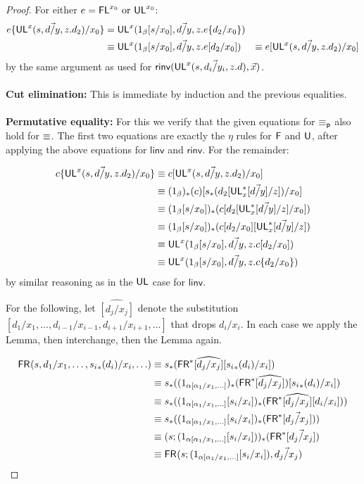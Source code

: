 \begin{proof}
For either $e = \mathsf{FL}^{x_0} \text{ or } \mathsf{UL}^{x_0}$:
\begin{align*}
e\{\mathsf{UL}^{x}_{}(s,\vec{d/y},z.d_2)/x_0\} 
&= \mathsf{UL}^{x}_{}(1_\beta[s/x_0],\vec{d/y},z.e\{d_2/x_0\}) \\
&\equiv \mathsf{UL}^{x}_{}(1_\beta[s/x_0],\vec{d/y},z.e[d_2/x_0]) 
&\equiv e[\mathsf{UL}^{x}_{}(s,\vec{d/y},z.d_2)/x_0] 
\end{align*}
by the same argument as used for $\mathsf{rinv}(\mathsf{UL}^{x}_{}(s,\vec{d_i/y_i},z.d),\vec{x})$.
\\~\\
\textbf{Cut elimination:} This is immediate by induction and the previous equalities.
\\~\\
\textbf{Permutative equality:} 
For this we verify that the given equations for $\equiv_{\mathsf{p}}$ also hold for $\equiv$. The first two equations are exactly the $\eta$ rules for $\mathsf{F}$ and $\mathsf{U}$, after applying the above equations for $\mathsf{linv}$ and $\mathsf{rinv}$. For the remainder:

\begin{align*}
c\{\mathsf{UL}^{x}_{}(s,\vec{d/y},z.d_2)/x_0\} 
&\equiv c[\mathsf{UL}^{x}_{}(s,\vec{d/y},z.d_2)/x_0] \\
&\equiv (1_\beta)_*(c)[s_*(d_2[\mathsf{UL}^*_{x}[\vec{d/y}]/z])/x_0] \\
&\equiv (1_\beta[s/x_0])_*(c[d_2[\mathsf{UL}^*_{x}[\vec{d/y}]/z]/x_0]) \\
&\equiv (1_\beta[s/x_0])_*(c[d_2/x_0][\mathsf{UL}^*_{x}[\vec{d/y}]/z]) \\
&\equiv \mathsf{UL}^{x}_{}(1_\beta[s/x_0],\vec{d/y},z.c[d_2/x_0]) \\
&\equiv \mathsf{UL}^{x}_{}(1_\beta[s/x_0],\vec{d/y},z.c\{d_2/x_0\}) \\
\end{align*}
by similar reasoning as in the $\mathsf{UL}$ case for $\mathsf{linv}$.

For the following, let $\widehat{[d_j/x_j]}$ denote the substitution $[d_1/x_1, \dots, d_{i-1}/x_{i-1}, d_{i+1}/x_{i+1}, \dots]$ that drops $d_i/x_i$. In each case we apply the Lemma, then interchange, then the Lemma again.

\begin{align*}
\mathsf{FR}_{}(s,d_1/x_1,\ldots,{s_i}_*(d_i)/x_i,\ldots) 
&\equiv s_*(\mathsf{FR}^*\widehat{[d_j/x_j]}[{s_i}_*(d_i)/x_i])\\
&\equiv s_*((1_{\alpha[\alpha_1/x_1,\ldots]})_*(\mathsf{FR}^*\widehat{[d_j/x_j]})[{s_i}_*(d_i)/x_i])\\
&\equiv s_*((1_{\alpha[\alpha_1/x_1,\ldots]}[s_i/x_i])_*(\mathsf{FR}^*\widehat{[d_j/x_j]}[d_i/x_i]))\\
&\equiv s_*((1_{\alpha[\alpha_1/x_1,\ldots]}[s_i/x_i])_*(\mathsf{FR}^*[\vec{d_j/x_j}]))\\
&\equiv (s;(1_{\alpha[\alpha_1/x_1,\ldots]}[s_i/x_i]))_*(\mathsf{FR}^*[\vec{d_j/x_j}]) \\
& \equiv \mathsf{FR}_{}(s;(1_{\alpha[\alpha_1/x_1,\ldots]}[s_i/x_i]),\vec{d_j/x_j}) 
\end{align*}


\end{proof}
